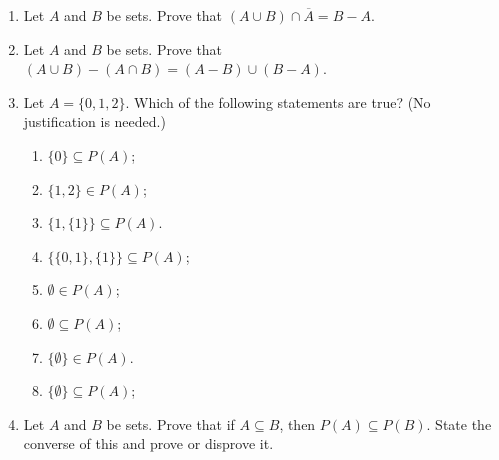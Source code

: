 \documentclass[12pt]{article}
\begin{document}
\begin{enumerate}
 
\item Let $A$ and $B$ be sets. Prove that $(A \cup B) \cap \overline{A} = B - A$.
\item Let $A$ and $B$ be sets. Prove that $(A \cup B) - (A \cap B) = (A - B) \cup (B - A)$.
\item Let $A = \{0,1,2\}$. Which of the following statements are true? (No justification is needed.)

 \begin{enumerate}
 \item $\{0\} \subseteq P(A)$;\vspace{0.3cm}
 \item $\{1,2\} \in P(A)$;\vspace{0.3cm}
 \item $\{1,\{1\}\} \subseteq P(A)$.\\ 
 \item $\{\{0,1\},\{1\}\} \subseteq P(A)$;\vspace{0.3cm}
 \item $\emptyset \in P(A)$;\vspace{0.3cm}
 \item $\emptyset \subseteq P(A)$;\vspace{0.3cm}
 \item $\{\emptyset\} \in P(A)$. \vspace{0.3cm}
 \item $\{\emptyset\} \subseteq P(A)$;\vspace{0.3cm}

 \end{enumerate}
\item Let $A$ and $B$ be sets. Prove that if $A \subseteq B$, then $P(A) \subseteq P(B)$. State the converse of this and prove or disprove it.

\end{enumerate}




\end{document}
